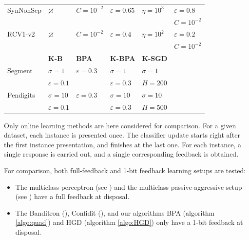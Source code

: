 \documentclass[preprint,12pt,authoryear]{elsarticle}
\begin{document}
\begin{table}[h]
\begin{center}
\begin{tabular}{llllll}
			SynNonSep & $\varnothing$ & $C=10^{-2}$ & $\varepsilon =0.65$ & $\eta = 10^3$& $\varepsilon = 0.8$\\
			&&&&& $C = 10^{-2}$\\			
			RCV1-v2 & $\varnothing$ & $C=10^{-2}$ & $\varepsilon =0.4$ & $\eta = 10^2$ & $\varepsilon = 0.2$\\
			&&&&& $C = 10^{-2}$\\
			\hline
			&{\bf K-B} & {\bf BPA} & {\bf K-BPA} &{\bf K-SGD}\\
			\hline
			Segment & $\sigma = 1$ & $\varepsilon = 0.3$ & $\sigma = 1$ &$\sigma = 1$\\
			&$\varepsilon =0.1$&&$\varepsilon = 0.3$ & $H = 200$\\
			Pendigits & $\sigma = 10$ & $\varepsilon = 0.3$ &$\sigma = 10$&$\sigma = 10$\\
			&$\varepsilon =0.1$&& $\varepsilon = 0.3$ & $H = 500$\\
			
			
		\end{tabular}	
	\end{center}
\end{table}


Only  online learning methods are here considered for comparison. For a given dataset, each instance is presented once. The classifier update starts right after the first instance presentation, and finishes at the last one. For each instance, a single response is carried out, and a single corresponding feedback is obtained.

For comparison, both full-feedback and 1-bit feedback learning setups are tested:
\begin{itemize}
	\item The multiclass perceptron (see \cite{duda1973pattern}) and the multiclass passive-aggressive setup (see  \cite{crammer2006online}) have a full feedback at disposal.
	\item The Banditron (\cite{kakade2008efficient}), Confidit (\cite{crammer2013multiclass}), and our algorithms BPA (algorithm \ref{algo:quad}) and HGD (algorithm \ref{algo:HGD}) only have a 1-bit feedback at disposal.
\end{itemize} 
\end{document}
